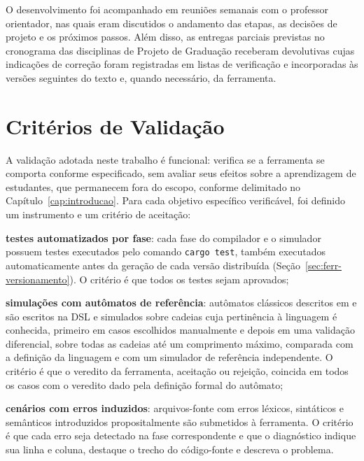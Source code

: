 \documentclass[
    12pt
    ,oneside
    ,a4paper
    ,chapter=TITLE
    ,section=TITLE
    ,sumario=abnt-6027-2012]{abntex2}
\begin{document}
O desenvolvimento foi acompanhado em reuniões semanais com o professor orientador, nas quais
eram discutidos o andamento das etapas, as decisões de projeto e os próximos passos. Além
disso, as entregas parciais previstas no cronograma das disciplinas de Projeto de Graduação
receberam devolutivas cujas indicações de correção foram registradas em listas de verificação
e incorporadas às versões seguintes do texto e, quando necessário, da ferramenta.

\section{Critérios de Validação}
\label{sec:met-validacao}

A validação adotada neste trabalho é funcional: verifica se a ferramenta se comporta conforme
especificado, sem avaliar seus efeitos sobre a aprendizagem de estudantes, que permanecem fora
do escopo, conforme delimitado no Capítulo~\ref{cap:introducao}. Para cada objetivo
específico verificável, foi definido um instrumento e um critério de aceitação:

\begin{alineas}
    \item \textbf{testes automatizados por fase}: cada fase do compilador e o simulador
    possuem testes executados pelo comando \texttt{cargo test}, também executados
    automaticamente antes da geração de cada versão distribuída
    (Seção~\ref{sec:ferr-versionamento}). O critério é que todos os testes sejam aprovados;
    \item \textbf{simulações com autômatos de referência}: autômatos clássicos descritos em
     e  são escritos na DSL e simulados sobre
    cadeias cuja pertinência à linguagem é conhecida, primeiro em casos escolhidos
    manualmente e depois em uma validação diferencial, sobre todas as cadeias até um
    comprimento máximo, comparada com a definição da linguagem e com um simulador de
    referência independente. O critério é que o veredito da ferramenta, aceitação ou
    rejeição, coincida em todos os casos com o veredito dado pela definição formal do
    autômato;
    \item \textbf{cenários com erros induzidos}: arquivos-fonte com erros léxicos,
    sintáticos e semânticos introduzidos propositalmente são submetidos à ferramenta. O
    critério é que cada erro seja detectado na fase correspondente e que o diagnóstico
    indique sua linha e coluna, destaque o trecho do código-fonte e descreva o problema.
\end{alineas}
\end{document}
